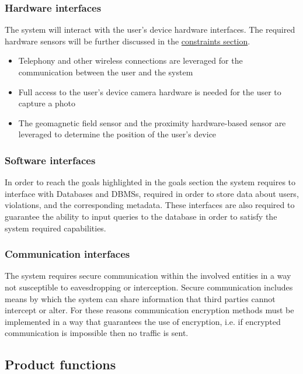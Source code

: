 \subsubsection{Hardware interfaces}
	The system will interact with the user's device hardware interfaces. The required hardware sensors will be further discussed in the \hyperref[sec:constraints]{constraints section}.
	
	\begin{itemize} 
		\item Telephony and other wireless connections are leveraged for the communication between the user and the system
		\item Full access to the user's device camera hardware is needed for the user to capture a photo
		\item The geomagnetic field sensor and the proximity hardware-based sensor are leveraged to determine the position of the user's device
	\end{itemize}

\subsubsection{Software interfaces}
	In order to reach the goals highlighted in the goals section the system requires to interface with Databases and DBMSs, required in order to store data about users, violations, and the corresponding metadata. These interfaces are also required to guarantee the ability to input queries to the database in order to satisfy the system required capabilities.
	
\subsubsection{Communication interfaces}
	The system requires secure communication within the involved entities in a way not susceptible to eavesdropping or interception. Secure communication includes means by which the system can share information that third parties cannot intercept or alter. For these reasons communication encryption methods must be implemented in a way that guarantees the use of encryption, i.e. if encrypted communication is impossible then no traffic is sent.
	
\subsection{Product functions}
